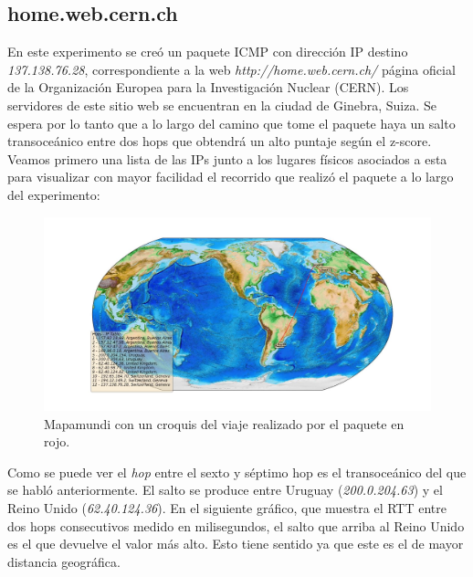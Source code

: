 \subsection{home.web.cern.ch}

En este experimento se creó un paquete ICMP con dirección IP destino \textit{137.138.76.28}, correspondiente a la web \textit{http://home.web.cern.ch/} página oficial de la Organización Europea para la Investigación Nuclear (CERN). Los servidores de este sitio web se encuentran en la ciudad de Ginebra, Suiza. Se espera por lo tanto que a lo largo del camino que tome el paquete haya un salto transoceánico entre dos hops que obtendrá un alto puntaje según el z-score. Veamos primero una lista de las IPs junto a los lugares físicos asociados a esta para visualizar con mayor facilidad el recorrido que realizó el paquete a lo largo del experimento:

\begin{landscape}
\begin{figure}[H]
  \centering	
	\includegraphics[scale=0.5]{../cern-experiment/figure_1.jpeg}
  \caption{Mapamundi con un croquis del viaje realizado por el paquete en rojo.}
	\label{fig:histo-src-sitiotrabajo}
\end{figure}
\end{landscape}

Como se puede ver el \textit{hop} entre el sexto y séptimo hop es el transoceánico del que se habló anteriormente. El salto se produce entre Uruguay (\textit{200.0.204.63}) y el Reino Unido (\textit{62.40.124.36}). En el siguiente gráfico, que muestra el RTT entre dos hops consecutivos medido en milisegundos, el salto que arriba al Reino Unido es el que devuelve el valor más alto. Esto tiene sentido ya que este es el de mayor distancia geográfica.

